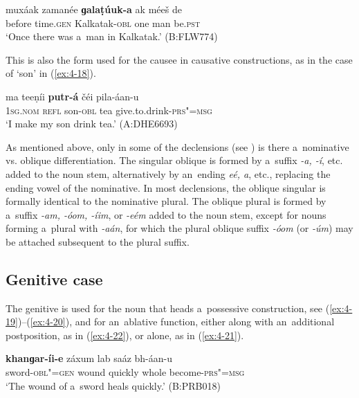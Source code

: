 \begin{exe}
\ex
\label{ex:4-17}
\gll muxáak zamanée \textbf{ɡalaṭúuk-a} ak méeš de \\
	before time.\textsc{gen} Kalkatak-\textsc{obl} one man be.\textsc{pst} \\
\glt `Once there was a~man in Kalkatak.' (B:FLW774)
\end{exe}

This is also the form used for the causee in causative constructions, as in the case of `son' in (\ref{ex:4-18}). 


\begin{exe}
\ex
\label{ex:4-18}
\gll ma teeṇíi \textbf{putr-á} čéi pila-áan-u \\
	\textsc{1sg.nom} \textsc{refl} son-\textsc{obl} tea give.to.drink-\textsc{prs"=msg} \\
\glt `I make my son drink tea.' (A:DHE6693)
\end{exe}

As mentioned above, only in some of the declensions (see ) is there a~nominative vs. oblique differentiation. The singular oblique is formed by a~suffix \textit{-a, -í}, etc. added to the noun stem, alternatively by an~ending \textit{eé, a}, etc., replacing the ending vowel of the nominative. In most declensions, the oblique singular is formally identical to the nominative plural. The oblique plural is formed by a~suffix \textit{-am, -óom, -íim}, or \textit{-eém} added to the noun stem, except for nouns forming a~plural with \textit{-aán}, for which the plural oblique suffix \textit{-óom} (or \textit{-úm}) may be attached subsequent to the plural suffix.

\subsection{Genitive case}
\label{subsec:4-5-3}

The genitive is used for the noun that heads a~possessive construction, see (\ref{ex:4-19})--(\ref{ex:4-20}), and for an~ablative function, either along with an~additional postposition, as in (\ref{ex:4-22}), or alone, as in (\ref{ex:4-21}).


\begin{exe}
\ex
\label{ex:4-19}
\gll \textbf{khanɡar-íi-e} záxum lab saáz bh-áan-u \\
	sword-\textsc{obl"=gen} wound quickly whole become-\textsc{prs"=msg} \\
\glt `The wound of a~sword heals quickly.' (B:PRB018)
\end{exe}

